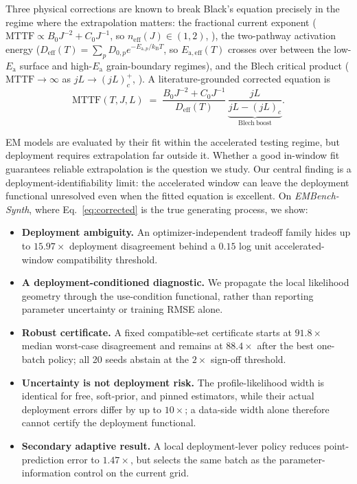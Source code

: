 \documentclass{article}
\newcommand{\Ea}{E_{\mathrm{a}}}
\newcommand{\Deff}{D_{\mathrm{eff}}}
\newcommand{\MTTF}{\mathrm{MTTF}}
\begin{document}
Three physical corrections are known to break Black's equation precisely in the
regime where the extrapolation matters: the fractional current exponent
($\MTTF\propto B_0J^{-2}+C_0J^{-1}$, so $n_{\mathrm{eff}}(J)\in(1,2)$,
\citealp{lloyd}), the two-pathway activation energy
($\Deff(T)=\sum_p D_{0,p}e^{-E_{\mathrm{a},p}/k_{\mathrm{B}}T}$, so $E_{\mathrm{a,eff}}(T)$
crosses over between the low-$\Ea$ surface and high-$\Ea$ grain-boundary
regimes), and the Blech critical product
($\MTTF\to\infty$ as $jL\to(jL)_c^+$, \citealp{blech}). A literature-grounded
corrected equation is
\begin{equation}
  \label{eq:corrected}
  \MTTF(T,J,L) \;=\; \frac{B_0J^{-2}+C_0J^{-1}}{\Deff(T)}\,
  \underbrace{\frac{jL}{jL-(jL)_c}}_{\mathrm{Blech\ boost}}.
\end{equation}

EM models are evaluated by their fit within the accelerated testing regime, but
deployment requires extrapolation far outside it. Whether a good in-window fit
guarantees reliable extrapolation is the question we study. Our central finding
is a deployment-identifiability limit: the accelerated window can leave the
deployment functional unresolved even when the fitted equation is excellent.
On \emph{EMBench-Synth}, where Eq.~\eqref{eq:corrected} is the true generating
process, we show:
\begin{itemize}
  \item \textbf{Deployment ambiguity.} An optimizer-independent tradeoff family
        hides up to $15.97\times$ deployment disagreement behind a $0.15$ log
        unit accelerated-window compatibility threshold.
  \item \textbf{A deployment-conditioned diagnostic.} We propagate the local
        likelihood geometry through the use-condition functional, rather than
        reporting parameter uncertainty or training RMSE alone.
  \item \textbf{Robust certificate.} A fixed compatible-set certificate starts
        at $91.8\times$ median worst-case disagreement and remains at
        $88.4\times$ after the best one-batch policy; all 20 seeds abstain at
        the $2\times$ sign-off threshold.
  \item \textbf{Uncertainty is not deployment risk.} The profile-likelihood
        width is identical for free, soft-prior, and pinned estimators, while
        their actual deployment errors differ by up to $10\times$; a data-side
        width alone therefore cannot certify the deployment functional.
  \item \textbf{Secondary adaptive result.} A local deployment-lever policy
        reduces point-prediction error to $1.47\times$, but selects the same
        batch as the parameter-information control on the current grid.
\end{itemize}
\end{document}
